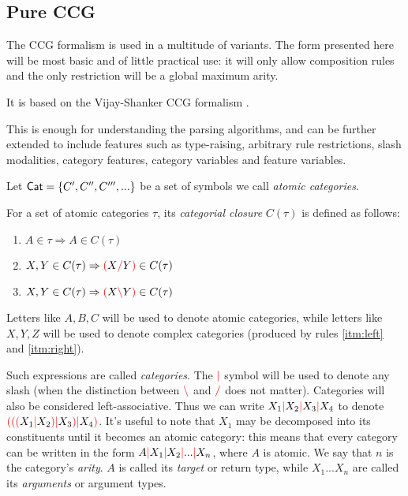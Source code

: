 \documentclass[main.tex]{subfiles}
\begin{document}
\subsection{Pure CCG}
\label{sec:ccg}
The CCG formalism is used in a multitude of variants. The form presented here
will be most basic and of little practical use: it will only allow composition
rules and the only restriction will be a global maximum arity.

It is based on the Vijay-Shanker CCG formalism \cite{shanker}.

This is enough for understanding the parsing algorithms, and can be further
extended to include features such as type-raising,
arbitrary rule restrictions, slash modalities,
category features, category variables and feature variables.

Let $\mathsf{Cat} = \{ C', C'', C''', ... \}$ be a set of symbols we call
\emph{atomic categories}.

\begin{defn}
    For a set of atomic categories $\tau$, its
    \emph{categorial closure} $C(\tau)$ is defined as follows:
    \begin{enumerate}
        \item \label{itm:atomic} $A \in \tau \Rightarrow A \in C(\tau)$
        \item \label{itm:right}  $X, Y \in C(\tau) \Rightarrow \textcolor{red}{(} X \textcolor{red}{/} Y \textcolor{red}{)} \in C(\tau)$
        \item \label{itm:left}   $X, Y \in C(\tau) \Rightarrow \textcolor{red}{(} X \textcolor{red}{\backslash} Y \textcolor{red}{)} \in C(\tau)$
    \end{enumerate}

    Letters like $A, B, C$ will be used to denote atomic categories,
    while letters like $X, Y, Z$ will be used to
    denote complex categories (produced by rules \ref{itm:left} and \ref{itm:right}).

    Such expressions are called \emph{categories}. The $\textcolor{red}{|}$ symbol will be
    used to denote any slash (when the distinction between $\textcolor{red}{\backslash}$ and $\textcolor{red}{/}$
    does not matter). Categories will also be considered left-associative.
    Thus we can write $X_1 \textcolor{red}{|} X_2 \textcolor{red}{|} X_3 \textcolor{red}{|} X_4$ to denote
    $\textcolor{red}{(} \textcolor{red}{(} \textcolor{red}{(} X_1 \textcolor{red}{|} X_2 \textcolor{red}{)} \textcolor{red}{|} X_3 \textcolor{red}{)} \textcolor{red}{|} X_4 \textcolor{red}{)}$. It's useful to note that $X_1$ may
    be decomposed into its constituents until it becomes an atomic category:
    this means that every category can be written in the form
    $A \textcolor{red}{|} X_1 \textcolor{red}{|} X_2 \textcolor{red}{|} ... \textcolor{red}{|} X_n$, where $A$ is atomic. We say that
    $n$ is the category's \emph{arity}. $A$ is called its \emph{target} or
    return type, while
    $X_1 ... X_n$ are called its \emph{arguments} or argument types.
\end{defn}
\end{document}
